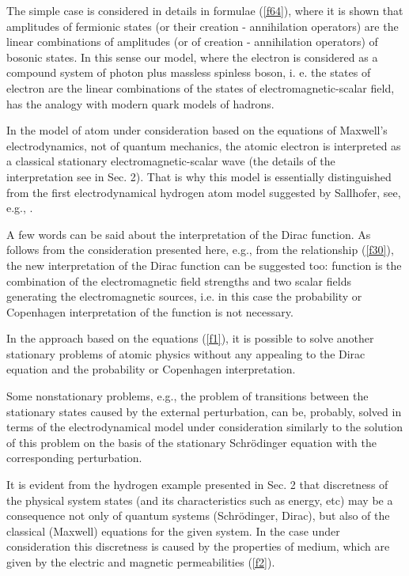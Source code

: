 \documentclass[a4paper,12pt]{article}
\begin{document}
The simple case \coordHE{}  \coordHE{} is considered in details in
formulae (\ref{f64}), where it is shown that amplitudes of fermionic states
(or their creation - annihilation operators) are the linear combinations of
amplitudes (or of creation - annihilation operators) of bosonic states. In
this sense our model, where the electron is considered as a compound system
of photon plus massless spinless boson, i. e. the states of electron are the
linear combinations of the states of electromagnetic-scalar field, has the
analogy with modern quark models of hadrons.

In the model of atom under consideration based on the equations of Maxwell's
electrodynamics, not of quantum mechanics, the atomic electron is
interpreted as a classical stationary electromagnetic-scalar wave (the
details of the interpretation see in Sec. 2). That is why this model is
essentially distinguished from the first electrodynamical hydrogen atom
model suggested by Sallhofer, see, e.g., \cite{SALL,LAK}.

A few words can be said about the interpretation of the Dirac \myHighlight{$\Psi $}\coordHE{}
function. As follows from the consideration presented here, e.g., from the
relationship (\ref{f30}), the new interpretation of the Dirac \myHighlight{$\Psi $}\coordHE{}
function can be suggested too: \myHighlight{$\Psi $}\coordHE{} function is the combination of the
electromagnetic field strengths \coordHE{} and two scalar fields \coordHE{} generating the
electromagnetic sources, i.e. in this case the probability or Copenhagen
interpretation of the function \myHighlight{$\Psi $}\coordHE{} is not necessary.

In the approach based on the equations (\ref{f1}), it is possible to solve
another stationary problems of atomic physics without any appealing to the
Dirac equation and the probability or Copenhagen interpretation.

Some nonstationary problems, e.g., the problem of transitions between the
stationary states caused by the external perturbation, can be, probably,
solved in terms of the electrodynamical model under consideration similarly
to the solution of this problem on the basis of the stationary Schr\"odinger
equation with the corresponding perturbation.

It is evident from the hydrogen example presented in Sec. 2 that discretness
of the physical system states (and its characteristics such as energy, etc)
may be a consequence not only of quantum systems (Schr\"odinger, Dirac), but
also of the classical (Maxwell) equations for the given system. In the case
under consideration this discretness is caused by the properties of medium,
which are given by the electric and magnetic permeabilities (\ref{f2}).
\end{document}
